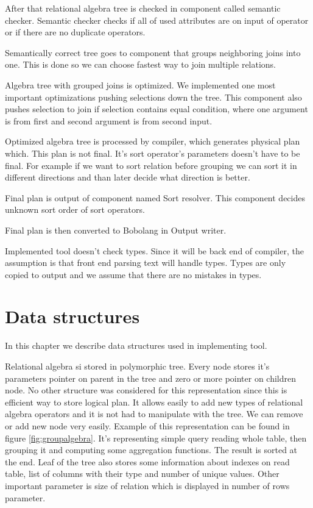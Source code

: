 After that relational algebra tree is checked in component called semantic checker. Semantic checker checks if all of used attributes are on input of operator or if there are no duplicate operators. 

Semantically correct tree goes to component that groups neighboring joins into one. This is done so we can choose fastest way to join multiple relations.

Algebra tree with grouped joins is optimized. We implemented one most important optimizations pushing selections down the tree. This component also pushes selection to join if selection contains equal condition, where one argument is from first and second argument is from second input.

Optimized algebra tree is processed by compiler, which generates physical plan which. This plan is not final. It's sort operator's parameters doesn't have to be final. For example if we want to sort relation before grouping we can sort it in different directions and than later decide what direction is better.

Final plan is output of component named Sort resolver. This component decides unknown sort order of sort operators.

Final plan is then converted to Bobolang in Output writer.

Implemented tool doesn't check types. Since it will be back end of compiler, the assumption is that front end parsing text will handle types. Types are only copied to output and we assume that there are no mistakes in types.

\section{Data structures}

In this chapter we describe data structures used in implementing tool.

Relational algebra si stored in polymorphic tree. Every node stores it's parameters pointer on parent in the tree and zero or more pointer on children node. No other structure was considered for this representation since this is efficient way to store logical plan. It allows easily to add new types of relational algebra operators and it is not had to manipulate with the tree. We can remove or add new node very easily. 
Example of this representation can be found in figure \ref{fig:groupalgebra}. It's representing simple query reading whole table, then grouping it and computing some aggregation functions. The result is sorted at the end. Leaf of the tree also stores some information about indexes on read table, list of columns with their type and number of unique values. Other important parameter is size of relation which is displayed in number of rows parameter.

